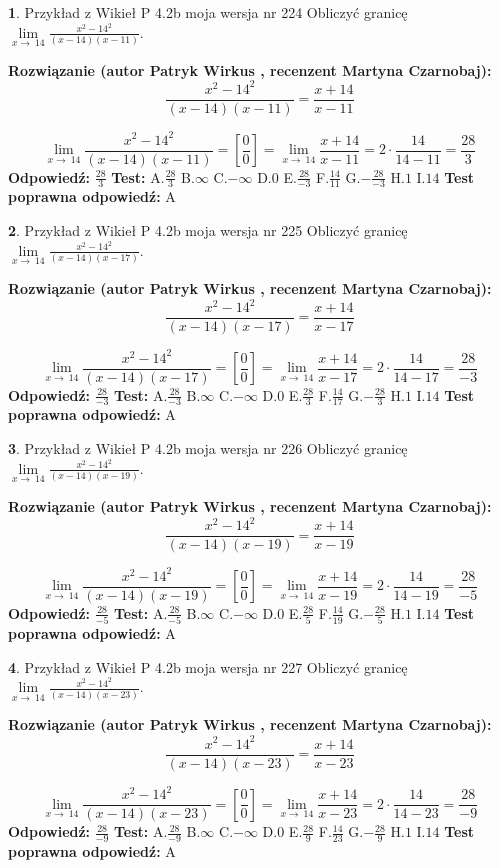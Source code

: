 \documentclass[12pt, a4paper]{article}
\theoremstyle{definition} %
\newtheorem{zad}{}
\newcommand{\zadStart}[1]{\begin{zad}#1\newline}
\newcommand{\zadStop}{\end{zad}}
\newcommand{\rozwStart}[2]{\noindent \textbf{Rozwiązanie (autor #1 , recenzent #2): }\newline}
\newcommand{\rozwStop}{\newline}
\newcommand{\odpStart}{\noindent \textbf{Odpowiedź:}\newline}
\newcommand{\odpStop}{\newline}
\newcommand{\testStart}{\noindent \textbf{Test:}\newline}
\newcommand{\testStop}{\newline}
\newcommand{\kluczStart}{\noindent \textbf{Test poprawna odpowiedź:}\newline}
\newcommand{\kluczStop}{\newline}
\begin{document}
\zadStart{Przykład z Wikieł P 4.2b moja wersja nr 224}
Obliczyć granicę $\lim\limits_{x\to\ 14}\frac{x^{2}-14^{2}}{(x-14)(x-11)}$.
\zadStop
\rozwStart{Patryk Wirkus}{Martyna Czarnobaj}
$$\frac{x^{2}-14^{2}}{(x-14)(x-11)}=\frac{x+14}{x-11}$$

$$\lim\limits_{x\to\ 14}\frac{x^{2}-14^{2}}{(x-14)(x-11)}=[\frac{0}{0}]=\lim\limits_{x\to\ 14}\frac{x+14}{x-11}=2 \cdot \frac{14}{14-11} = \frac{28}{3}$$
\rozwStop
\odpStart
$\frac{28}{3}$
\odpStop
\testStart
A.$\frac{28}{3}$
B.$\infty$
C.$-\infty$
D.$0$
E.$\frac{28}{-3}$
F.$\frac{14}{11}$
G.$-\frac{28}{-3}$
H.$1$
I.$14$
\testStop
\kluczStart
A
\kluczStop



\zadStart{Przykład z Wikieł P 4.2b moja wersja nr 225}
Obliczyć granicę $\lim\limits_{x\to\ 14}\frac{x^{2}-14^{2}}{(x-14)(x-17)}$.
\zadStop
\rozwStart{Patryk Wirkus}{Martyna Czarnobaj}
$$\frac{x^{2}-14^{2}}{(x-14)(x-17)}=\frac{x+14}{x-17}$$

$$\lim\limits_{x\to\ 14}\frac{x^{2}-14^{2}}{(x-14)(x-17)}=[\frac{0}{0}]=\lim\limits_{x\to\ 14}\frac{x+14}{x-17}=2 \cdot \frac{14}{14-17} = \frac{28}{-3}$$
\rozwStop
\odpStart
$\frac{28}{-3}$
\odpStop
\testStart
A.$\frac{28}{-3}$
B.$\infty$
C.$-\infty$
D.$0$
E.$\frac{28}{3}$
F.$\frac{14}{17}$
G.$-\frac{28}{3}$
H.$1$
I.$14$
\testStop
\kluczStart
A
\kluczStop



\zadStart{Przykład z Wikieł P 4.2b moja wersja nr 226}
Obliczyć granicę $\lim\limits_{x\to\ 14}\frac{x^{2}-14^{2}}{(x-14)(x-19)}$.
\zadStop
\rozwStart{Patryk Wirkus}{Martyna Czarnobaj}
$$\frac{x^{2}-14^{2}}{(x-14)(x-19)}=\frac{x+14}{x-19}$$

$$\lim\limits_{x\to\ 14}\frac{x^{2}-14^{2}}{(x-14)(x-19)}=[\frac{0}{0}]=\lim\limits_{x\to\ 14}\frac{x+14}{x-19}=2 \cdot \frac{14}{14-19} = \frac{28}{-5}$$
\rozwStop
\odpStart
$\frac{28}{-5}$
\odpStop
\testStart
A.$\frac{28}{-5}$
B.$\infty$
C.$-\infty$
D.$0$
E.$\frac{28}{5}$
F.$\frac{14}{19}$
G.$-\frac{28}{5}$
H.$1$
I.$14$
\testStop
\kluczStart
A
\kluczStop



\zadStart{Przykład z Wikieł P 4.2b moja wersja nr 227}
Obliczyć granicę $\lim\limits_{x\to\ 14}\frac{x^{2}-14^{2}}{(x-14)(x-23)}$.
\zadStop
\rozwStart{Patryk Wirkus}{Martyna Czarnobaj}
$$\frac{x^{2}-14^{2}}{(x-14)(x-23)}=\frac{x+14}{x-23}$$

$$\lim\limits_{x\to\ 14}\frac{x^{2}-14^{2}}{(x-14)(x-23)}=[\frac{0}{0}]=\lim\limits_{x\to\ 14}\frac{x+14}{x-23}=2 \cdot \frac{14}{14-23} = \frac{28}{-9}$$
\rozwStop
\odpStart
$\frac{28}{-9}$
\odpStop
\testStart
A.$\frac{28}{-9}$
B.$\infty$
C.$-\infty$
D.$0$
E.$\frac{28}{9}$
F.$\frac{14}{23}$
G.$-\frac{28}{9}$
H.$1$
I.$14$
\testStop
\kluczStart
A
\kluczStop
\end{document}
